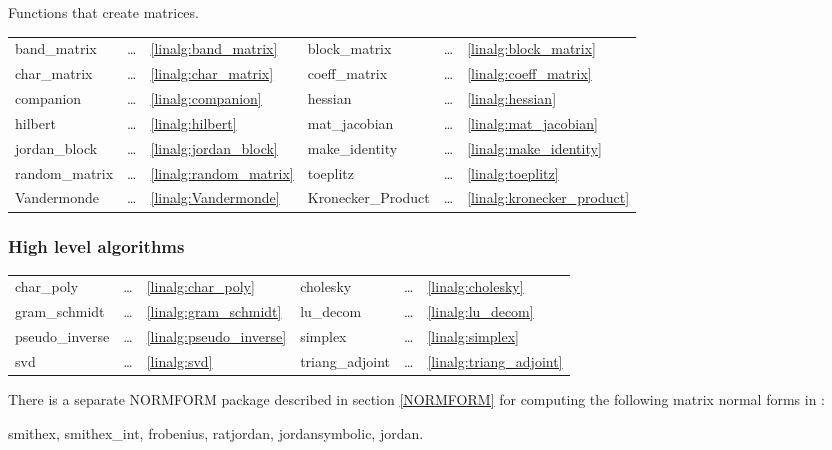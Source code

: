 {Functions that create matrices.

\begin{center}
\begin{tabular}{l l l l l l}
band\_matrix       & \ldots &\ref{linalg:band_matrix} &
block\_matrix      & \ldots &\ref{linalg:block_matrix} \\
char\_matrix       & \ldots &\ref{linalg:char_matrix} &
coeff\_matrix      & \ldots &\ref{linalg:coeff_matrix} \\
companion          & \ldots &\ref{linalg:companion} &
hessian            & \ldots &\ref{linalg:hessian} \\
hilbert            & \ldots &\ref{linalg:hilbert} &
mat\_jacobian      & \ldots &\ref{linalg:mat_jacobian} \\
jordan\_block      & \ldots &\ref{linalg:jordan_block} &
make\_identity     & \ldots &\ref{linalg:make_identity} \\
random\_matrix     & \ldots &\ref{linalg:random_matrix} &
toeplitz           & \ldots &\ref{linalg:toeplitz} \\
Vandermonde        & \ldots &\ref{linalg:Vandermonde} &
Kronecker\_Product & \ldots &\ref{linalg:kronecker_product}
\end{tabular}
\end{center}

\subsubsection{High level algorithms}

\begin{center}
\begin{tabular}{l l l l l l}
char\_poly       & \ldots &\ref{linalg:char_poly} &
cholesky         & \ldots &\ref{linalg:cholesky} \\
gram\_schmidt    & \ldots &\ref{linalg:gram_schmidt} &
lu\_decom        & \ldots &\ref{linalg:lu_decom} \\
pseudo\_inverse  & \ldots &\ref{linalg:pseudo_inverse} &
simplex          & \ldots &\ref{linalg:simplex} \\
svd              & \ldots &\ref{linalg:svd} &
triang\_adjoint  & \ldots &\ref{linalg:triang_adjoint}
\end{tabular}
\end{center}

There is a separate {\small NORMFORM} package described in section \ref{NORMFORM} for computing
the following matrix normal forms in \REDUCE:
\begin{center}
  smithex, smithex\_int, frobenius, ratjordan, jordansymbolic, jordan.
\end{center}


}
